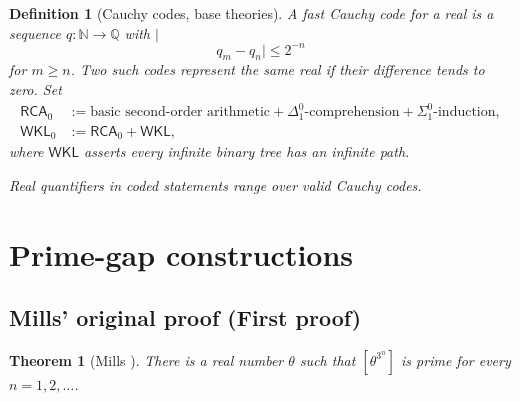 \documentclass[11pt,reqno]{amsart}
\providecommand{\N}{\mathbb{N}}
\providecommand{\Q}{\mathbb{Q}}
\theoremstyle{redplain}
\newtheorem{theorem}{Theorem}[section]
\newtheorem{definition}{Definition}[section]
\numberwithin{equation}{section}
\begin{document}
\begin{definition}[Cauchy codes, base theories]
\label{def:cauchy} A fast Cauchy code for a real is a sequence $q:\N%
\rightarrow \Q$ with $|$%
\begin{equation}
q_{m}-q_{n}|\leq 2^{-n}
\end{equation}%
for $m\geq n$. Two such codes represent the same real if their difference
tends to zero. Set 
\begin{equation}
\begin{aligned} \mathsf{RCA}_0&:=\text{basic second-order arithmetic}
+\Delta^0_1\text{-comprehension}+\Sigma^0_1\text{-induction},\\
\mathsf{WKL}_0&:=\mathsf{RCA}_0+\mathsf{WKL}, \end{aligned}
\end{equation}%
where $\mathsf{WKL}$ asserts every infinite binary tree has an infinite path.

\noindent%
Real quantifiers in coded statements range over valid Cauchy codes.
\end{definition}


\section{Prime-gap constructions}

\label{sec:prime-gap}

\subsection{Mills' original proof (First proof)}

\label{sec:mills}

\begin{theorem}[Mills \protect\cite{Mills1947}]
\label{thm:mills} There is a real number $\theta$ such that $[\theta^{3^n}]$
is prime for every $n=1,2,\dots$.
\end{theorem}
\end{document}
